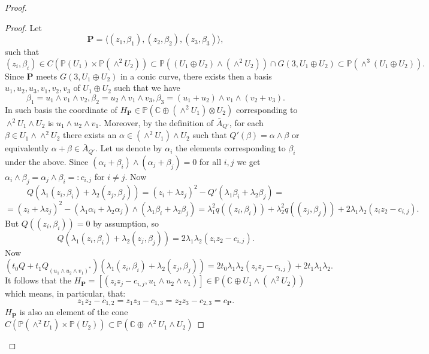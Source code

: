 \documentclass[a4paper,11pt]{amsart}
\theoremstyle{definition}
\numberwithin{equation}{section}
\numberwithin{equation}{section} \theoremstyle{definition}
\begin{document}
\begin{proof}
\begin{proof}
Let 
\[
\mathbf{P}=\langle(z_1,\beta_1),(z_2,\beta_2),(z_3,\beta_3)\rangle,
\]
 such that 
 \[
 (z_i,\beta_i)\in C({{\mathbb{P}}}(U_1)\times {{\mathbb{P}}}(\wedge^2 U_2))\subset {{\mathbb{P}}}((U_1\oplus U_2)\wedge (\wedge^2 U_2))\cap G(3,U_1\oplus U_2)\subset {{\mathbb{P}}}(\wedge^3 (U_1\oplus U_2)).
 \]
  Since $\mathbf{P}$ meets $G(3,U_1\oplus U_2)$ in a conic curve, there exists then a basis $u_1,u_2,u_3, v_1,v_2,v_3$ of $U_1\oplus U_2$ 
  such that we have 
  \[
  \beta_1=u_1\wedge v_1\wedge v_2, \beta_2=u_2\wedge v_1\wedge v_3, \beta_3= (u_1+u_2)\wedge v_1\wedge (v_2+v_3).
  \]
   In such basis the coordinate of $H_\mathbf{P}\in {{\mathbb{P}}}({{\mathbb{C}  }}\oplus (\wedge^2 U_1)\otimes U_2) $ corresponding to $\wedge^2 U_1\wedge U_2$ is $u_1\wedge u_2\wedge v_1$.
Moreover, by the definition of $\bar{A}_{Q'}$, for each $\beta\in U_1\wedge \wedge^2 U_2$ there exists an $\alpha\in (\wedge^2 U_1)\wedge U_2$ such that $Q'(\beta)=\alpha\wedge \beta$ or equivalently 
$\alpha+\beta\in \bar{A}_{Q'}$. Let us denote by $\alpha_i$ the  elements corresponding to $\beta_i$ under the above. Since $(\alpha_i+\beta_i)\wedge(\alpha_j+\beta_j)=0$ for all $i,j$ we get 
 $\alpha_i\wedge\beta_j=\alpha_j\wedge\beta_i=:c_{i,j}$ for $i\neq j$. 
Now 
$$Q(\lambda_1 (z_i,\beta_i)+\lambda_2 (z_j,\beta_j))=(z_i+\lambda z_j)^2- Q'(\lambda_1\beta_i+ \lambda_2 \beta_j)=$$
$$=(z_i+\lambda z_j)^2- (\lambda_1\alpha_i+ \lambda_2 \alpha_j)\wedge(\lambda_1\beta_i+ \lambda_2 \beta_j)=\lambda_1^2 q((z_i,\beta_i))+\lambda_2^2 q((z_j,\beta_j))+2 \lambda_1\lambda_2 (z_iz_2-c_{i,j}).$$
But $Q((z_i,\beta_i))=0$ by assumption, so
$$Q(\lambda_1 (z_i,\beta_i)+\lambda_2 (z_j,\beta_j))= 2\lambda_1\lambda_2 (z_iz_2-c_{i,j}).$$
Now 
$$(t_0Q+t_1 Q_{(u_1\wedge u_2\wedge v_1)^*}) (\lambda_1 (z_i,\beta_i)+\lambda_2 (z_j,\beta_j))=2t_0 \lambda_1\lambda_2 (z_iz_j-c_{i,j})+ 2t_1\lambda_1\lambda_2.$$
It follows that the $H_{\mathbf{P}}=[(z_iz_j-c_{i,j},  u_1\wedge u_2\wedge v_1) ]\in {{\mathbb{P}}}({{\mathbb{C}  }}\oplus U_1\wedge (\wedge^2 U_2))$ which means, in particular, that:
$$z_1z_2-c_{1,2}=z_1z_3-c_{1,3}=z_2z_3-c_{2,3}=c_{\mathbf{P}}.$$
$H_{\mathbf{P}}$ is also an element of the cone $C({{\mathbb{P}}}(\wedge^2 U_1)\times {{\mathbb{P}}}(U_2))\subset {{\mathbb{P}}}({{\mathbb{C}  }}\oplus \wedge^2 U_1\wedge U_2)$


\end{proof}
\end{proof}
\end{document}
